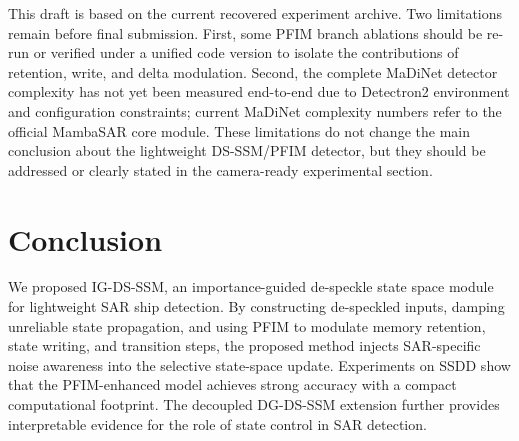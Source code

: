 \documentclass[letterpaper]{article}
\begin{document}
This draft is based on the current recovered experiment archive. Two limitations remain before final submission. First, some PFIM branch ablations should be re-run or verified under a unified code version to isolate the contributions of retention, write, and delta modulation. Second, the complete MaDiNet detector complexity has not yet been measured end-to-end due to Detectron2 environment and configuration constraints; current MaDiNet complexity numbers refer to the official MambaSAR core module. These limitations do not change the main conclusion about the lightweight DS-SSM/PFIM detector, but they should be addressed or clearly stated in the camera-ready experimental section.

\section{Conclusion}

We proposed IG-DS-SSM, an importance-guided de-speckle state space module for lightweight SAR ship detection. By constructing de-speckled inputs, damping unreliable state propagation, and using PFIM to modulate memory retention, state writing, and transition steps, the proposed method injects SAR-specific noise awareness into the selective state-space update. Experiments on SSDD show that the PFIM-enhanced model achieves strong accuracy with a compact computational footprint. The decoupled DG-DS-SSM extension further provides interpretable evidence for the role of state control in SAR detection.



\end{document}
